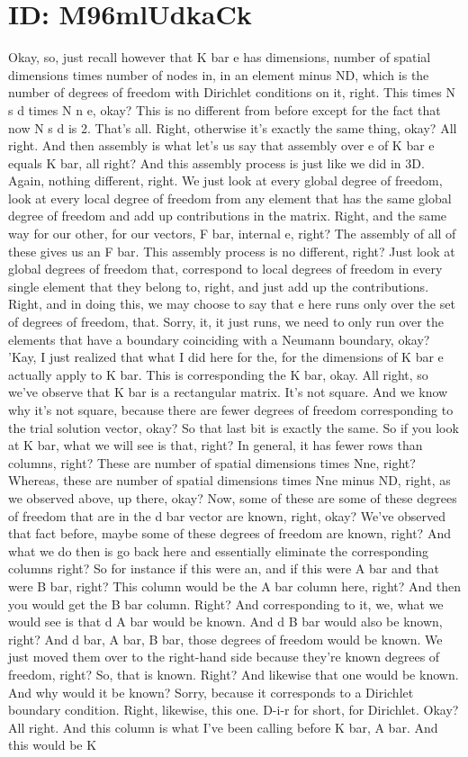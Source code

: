 \documentclass[10pt]{article}
\begin{document}
\section*{ID: M96mlUdkaCk}
Okay, so, just recall however that K bar e has dimensions, number of spatial dimensions times number of nodes in, in an element minus ND, which is the number of degrees of freedom with Dirichlet conditions on it, right. This times N s d times N n e, okay? This is no different from before except for the fact that now N s d is 2. That's all. Right, otherwise it's exactly the same thing, okay? All right. And then assembly is what let's us say that assembly over e of K bar e equals K bar, all right? And this assembly process is just like we did in 3D. Again, nothing different, right. We just look at every global degree of freedom, look at every local degree of freedom from any element that has the same global degree of freedom and add up contributions in the matrix. Right, and the same way for our other, for our vectors, F bar, internal e, right? The assembly of all of these gives us an F bar. This assembly process is no different, right? Just look at global degrees of freedom that, correspond to local degrees of freedom in every single element that they belong to, right, and just add up the contributions. Right, and in doing this, we may choose to say that e here runs only over the set of degrees of freedom, that. Sorry, it, it just runs, we need to only run over the elements that have a boundary coinciding with a Neumann boundary, okay? 'Kay, I just realized that what I did here for the, for the dimensions of K bar e actually apply to K bar. This is corresponding the K bar, okay. All right, so we've observe that K bar is a rectangular matrix. It's not square. And we know why it's not square, because there are fewer degrees of freedom corresponding to the trial solution vector, okay? So that last bit is exactly the same. So if you look at K bar, what we will see is that, right? In general, it has fewer rows than columns, right? These are number of spatial dimensions times Nne, right? Whereas, these are number of spatial dimensions times Nne minus ND, right, as we observed above, up there, okay? Now, some of these are some of these degrees of freedom that are in the d bar vector are known, right, okay? We've observed that fact before, maybe some of these degrees of freedom are known, right? And what we do then is go back here and essentially eliminate the corresponding columns right? So for instance if this were an, and if this were A bar and that were B bar, right? This column would be the A bar column here, right? And then you would get the B bar column. Right? And corresponding to it, we, what we would see is that d A bar would be known. And d B bar would also be known, right? And d bar, A bar, B bar, those degrees of freedom would be known. We just moved them over to the right-hand side because they're known degrees of freedom, right? So, that is known. Right? And likewise that one would be known. And why would it be known? Sorry, because it corresponds to a Dirichlet boundary condition. Right, likewise, this one. D-i-r for short, for Dirichlet. Okay? All right. And this column is what I've been calling before K bar, A bar. And this would be K 
\end{document}
